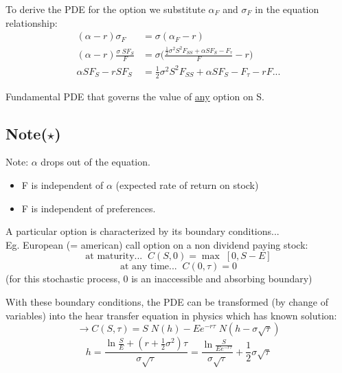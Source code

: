 \documentclass[
14pt,notheorems,hyperref={pdfauthor=whatever}
]{beamer}
\begin{document}
\begin{frame}
To derive the PDE for the option we substitute $\alpha_F$ and $\sigma_F$ in the equation relationship:\\
\begin{align*}
    (\alpha-r)\sigma_F &= \sigma(\alpha_F-r)\\
    (\alpha-r)\frac{\sigma\;SF_S}{F} &= \sigma\bigg(\frac{\frac{1}{2}\sigma^2 S^2 F_{SS}+\alpha S F_S - F_\tau}{F}-r\bigg)\\
    \alpha S F_S - r S F_S &= \frac{1}{2} \sigma^2 S^2 F_{SS} + \alpha S F_S - F_\tau -rF...
\end{align*}
\begin{center}
\end{center}
Fundamental PDE that governs the value of \underline{any} option on S.
\end{frame}

\subsection{Note($\star$)}
\begin{frame}
Note: $\alpha$ drops out of the equation.
\begin{itemize}
    \item F is independent of $\alpha$ (expected rate of return on stock)\\
    \item F is independent of preferences.\\
\end{itemize}
\hfill\break
A particular option is characterized by its boundary conditions...\\
\hfill\break
Eg. European (= american) call option on a non dividend paying stock:\\
\[\text{at maturity...} \;\; C(S,0) = \max\;[0,S-E]\]
\[\text{at any time...} \;\; C(0,\tau) = 0\]
(for this stochastic process, 0 is an inaccessible and absorbing boundary)
\end{frame}

\begin{frame}
With these boundary conditions, the PDE can be transformed (by change of variables) into the hear transfer equation in physics which has known solution:\\
\[\rightarrow C(S,\tau) = S\;N(h)-E e^{-r\tau}\;N(h-\sigma\sqrt{\tau})\]
\[h=\frac{\ln{\frac{S}{E}}+(r+\frac{1}{2}\sigma^2)\tau}{\sigma\sqrt{\tau}} = \frac{\ln{\frac{S}{E e^{-r\tau}}}}{\sigma\sqrt{\tau}}+\frac{1}{2}\sigma\sqrt{\tau}\]
\end{frame}
\end{document}
